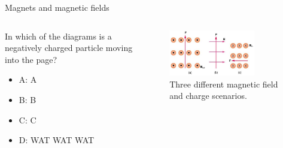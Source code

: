 \documentclass{beamer}
\begin{document}
\begin{frame}{Magnets and magnetic fields}
\begin{columns}[T]
\begin{column}{0.3\textwidth}
In which of the diagrams is a negatively charged particle moving into the page?
\begin{itemize}
\item A: A
\item B: B
\item C: C
\item D: WAT WAT WAT
\end{itemize}
\end{column}
\begin{column}{0.7\textwidth}
\begin{figure}
\centering
\includegraphics[width=0.75\textwidth]{figures/lorentzProblem.png}
\caption{\label{fig:lorentzProblem4} Three different magnetic field and charge scenarios.}
\end{figure}
\end{column}
\end{columns}
\end{frame}
\end{document}

